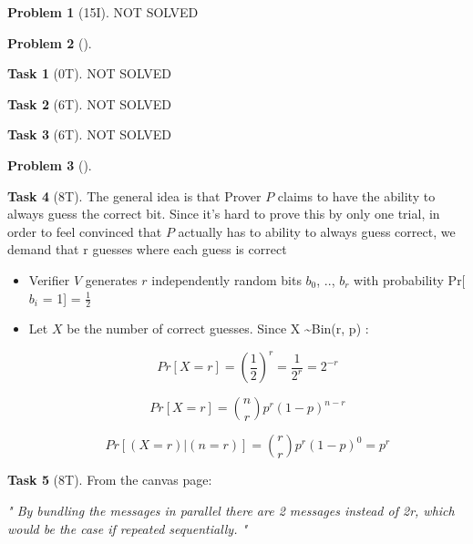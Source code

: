 \documentclass[11pt,twoside]{article}
\theoremstyle{definition}
\newtheorem{amsproblem}{Problem}
\newtheorem{amssubproblem}{Task}[amsproblem]
\newenvironment{problem}[1][]{%
  \begin{amsproblem}[#1]
  }{%
  \end{amsproblem}
}
\newenvironment{subproblem}[1][]{%
  \begin{amssubproblem}[#1]
  }{%
  \end{amssubproblem}
}
\newcommand{\TP}[1]{#1T}
\newcommand{\IP}[1]{#1I}
\begin{document}
\noindent
\hrulefill

\begin{problem}[\IP{15}]
  NOT SOLVED %
\end{problem}

\noindent
\hrulefill

\begin{problem}
  \begin{subproblem}[\TP{0}]
    NOT SOLVED %
  \end{subproblem}
  \begin{subproblem}[\TP{6}]
    NOT SOLVED %
  \end{subproblem}
  \begin{subproblem}[\TP{6}]
    NOT SOLVED %
  \end{subproblem}
\end{problem}

\noindent
\hrulefill




%
\begin{problem}
  \begin{subproblem}[\TP{8}]

The general idea is that Prover $P$ claims to have the ability to always guess the correct bit. Since it's hard to prove this by only one trial, in order to feel convinced that $P$ actually has to ability to always guess correct, we demand that r guesses where each guess is correct
\newline\newline
    \begin{itemize}
        \item Verifier $V$ generates $r$ independently random bits $b_0$, .., $b_r$ with probability Pr[ $b_i$ = 1] = $\frac{1}{2}$
        
        \item Let $X$ be the number of correct guesses. Since X \sim Bin(r, p) : \newline 
        
        
        $$ Pr[X = r] = {( \frac{1}{2})}^{r} = \frac{1}{2^r} = 2^{-r} $$
        
        
        $$ Pr[X=r] = \binom{n}{r}p^{r}(1-p)^{n-r} $$
        
        
        $$ Pr[(X=r) | (n=r)] = \binom{r}{r}p^{r}(1-p)^{0} = p^r  $$
        

    \end{itemize}

    
  \end{subproblem}
  \begin{subproblem}[\TP{8}]
    From the canvas page:
\item    \textit{" By bundling the messages in parallel there are 2 messages instead of 2r, which would be the case if repeated sequentially. "}

  \end{subproblem}
\end{problem}
\end{document}
